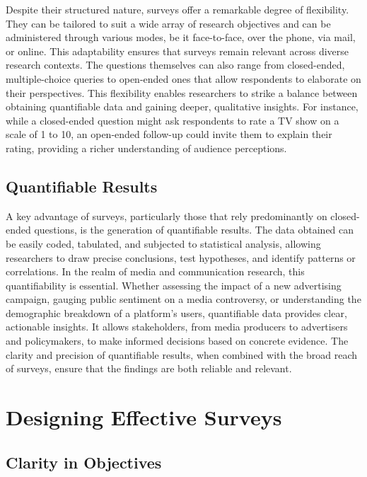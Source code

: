 \documentclass[
  b5paper]{book}
\begin{document}
Despite their structured nature, surveys offer a remarkable degree of flexibility. They can be tailored to suit a wide array of research objectives and can be administered through various modes, be it face-to-face, over the phone, via mail, or online. This adaptability ensures that surveys remain relevant across diverse research contexts. The questions themselves can also range from closed-ended, multiple-choice queries to open-ended ones that allow respondents to elaborate on their perspectives. This flexibility enables researchers to strike a balance between obtaining quantifiable data and gaining deeper, qualitative insights. For instance, while a closed-ended question might ask respondents to rate a TV show on a scale of 1 to 10, an open-ended follow-up could invite them to explain their rating, providing a richer understanding of audience perceptions.

\hypertarget{quantifiable-results}{%
\subsection*{Quantifiable Results}\label{quantifiable-results}}

A key advantage of surveys, particularly those that rely predominantly on closed-ended questions, is the generation of quantifiable results. The data obtained can be easily coded, tabulated, and subjected to statistical analysis, allowing researchers to draw precise conclusions, test hypotheses, and identify patterns or correlations. In the realm of media and communication research, this quantifiability is essential. Whether assessing the impact of a new advertising campaign, gauging public sentiment on a media controversy, or understanding the demographic breakdown of a platform's users, quantifiable data provides clear, actionable insights. It allows stakeholders, from media producers to advertisers and policymakers, to make informed decisions based on concrete evidence. The clarity and precision of quantifiable results, when combined with the broad reach of surveys, ensure that the findings are both reliable and relevant.

\hypertarget{designing-effective-surveys}{%
\section{Designing Effective Surveys}\label{designing-effective-surveys}}

\hypertarget{clarity-in-objectives}{%
\subsection*{Clarity in Objectives}\label{clarity-in-objectives}}
\end{document}
